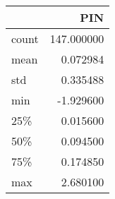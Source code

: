 \begin{tabular}{lr}
\toprule
{} &         PIN \\
\midrule
count &  147.000000 \\
mean  &    0.072984 \\
std   &    0.335488 \\
min   &   -1.929600 \\
25\%   &    0.015600 \\
50\%   &    0.094500 \\
75\%   &    0.174850 \\
max   &    2.680100 \\
\bottomrule
\end{tabular}
